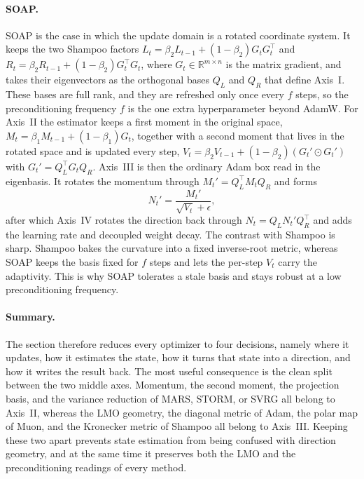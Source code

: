 \paragraph{SOAP.}
SOAP is the case in which the update domain is a rotated coordinate system. It keeps the two Shampoo factors $L_t=\beta_2 L_{t-1}+(1-\beta_2)G_t G_t^\top$ and $R_t=\beta_2 R_{t-1}+(1-\beta_2)G_t^\top G_t$, where $G_t\in\mathbb{R}^{m\times n}$ is the matrix gradient, and takes their eigenvectors as the orthogonal bases $Q_L$ and $Q_R$ that define Axis~I. These bases are full rank, and they are refreshed only once every $f$ steps, so the preconditioning frequency $f$ is the one extra hyperparameter beyond AdamW. For Axis~II the estimator keeps a first moment in the original space, $M_t=\beta_1 M_{t-1}+(1-\beta_1)G_t$, together with a second moment that lives in the rotated space and is updated every step, $V_t=\beta_2 V_{t-1}+(1-\beta_2)(G_t'\odot G_t')$ with $G_t'=Q_L^\top G_t Q_R$. Axis~III is then the ordinary Adam box read in the eigenbasis. It rotates the momentum through $M_t'=Q_L^\top M_t Q_R$ and forms
\begin{equation}
  N_t'=\frac{M_t'}{\sqrt{V_t}+\epsilon},
\end{equation}
after which Axis~IV rotates the direction back through $N_t=Q_L N_t' Q_R^\top$ and adds the learning rate and decoupled weight decay. The contrast with Shampoo is sharp. Shampoo bakes the curvature into a fixed inverse-root metric, whereas SOAP keeps the basis fixed for $f$ steps and lets the per-step $V_t$ carry the adaptivity. This is why SOAP tolerates a stale basis and stays robust at a low preconditioning frequency.

\paragraph{Summary.}
The section therefore reduces every optimizer to four decisions, namely where it updates, how it estimates the state, how it turns that state into a direction, and how it writes the result back. The most useful consequence is the clean split between the two middle axes. Momentum, the second moment, the projection basis, and the variance reduction of MARS, STORM, or SVRG all belong to Axis~II, whereas the LMO geometry, the diagonal metric of Adam, the polar map of Muon, and the Kronecker metric of Shampoo all belong to Axis~III. Keeping these two apart prevents state estimation from being confused with direction geometry, and at the same time it preserves both the LMO and the preconditioning readings of every method.
